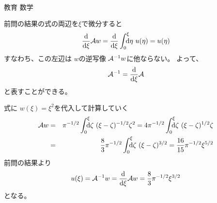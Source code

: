 \documentclass[fleqn]{jbook}
\begin{document}
\begin{answer}{教育 数学}{}
\begin{subanswers}
\begin{subsubanswers}
  \SubSubAnswer
    前問の結果の式の両辺を$\xi$で微分すると
%
    \[ \Deriver{}{\xi} {\cal A}w%
         = \Deriver{}{\xi}\Dint{0}{\xi}{\d{\eta}} u(\eta)%
         = u(\eta) \]
%
    すなわち、この左辺は $w$の逆写像 ${\cal A}^{-1}w$に他ならない。
    よって、
%
    \[ {\cal A}^{-1} = {\frac{{\rm d} }{{\rm d} \xi}}{\cal A} \]
%
    と表すことができる。


  \SubSubAnswer
    式に $w(\xi)=\xi^2 $を代入して計算していく
%
    \begin{eqnarray*}
      {\cal A}w%
        &=&  \pi^{-1/2}\Dint{0}{\xi}{\d{\zeta}}(\xi-\zeta)^{-1/2}\zeta^2 %
         = 4\pi^{-1/2}\Dint{0}{\xi}{\d{\zeta}}(\xi-\zeta)^{1/2} \zeta   \\
        &=& \frac{8}{3}\pi^{-1/2}\Dint{0}{\xi}{\d{\zeta}}(\xi-\zeta)^{3/2}%
         =  \frac{16}{15}\pi^{-1/2}\xi^{5/2}
    \end{eqnarray*}
%
    前問の結果より
%
    \[ u(\xi ) = {\cal A}^{-1}w = \Deriver{}{\xi}{\cal A}w%
               =  \frac{8}{3}\pi^{-1/2}\xi^{3/2} \]
%
    となる。

  \end{subsubanswers}

\end{subanswers}
\end{answer}
\end{document}
